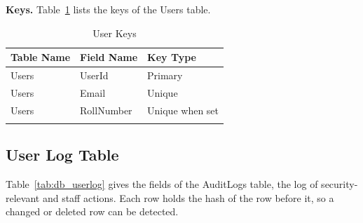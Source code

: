 \par\ifdim\dimexpr\pagegoal-\pagetotal\relax<180pt\newpage\fi
\noindent\textbf{Keys.} Table~\ref{tab:keys_user} lists the keys of the Users table.

{\small
\begin{longtable}{>{\raggedright\arraybackslash}p{4.0cm}>{\raggedright\arraybackslash}p{4.6cm}>{\raggedright\arraybackslash}p{4.6cm}}
\caption{User Keys}\label{tab:keys_user}\\
\hline\hline
\textbf{Table Name} & \textbf{Field Name} & \textbf{Key Type} \\ \hline
\endfirsthead
\hline\hline
\endlastfoot
Users & UserId & Primary \\*
Users & Email & Unique \\*
Users & RollNumber & Unique when set \\*
\end{longtable}
}

\par\ifdim\dimexpr\pagegoal-\pagetotal\relax<376pt\newpage\fi
\subsection{User Log Table}
Table~\ref{tab:db_userlog} gives the fields of the AuditLogs table, the log of security-relevant and staff actions. Each row holds the hash of the row before it, so a changed or deleted row can be detected.

